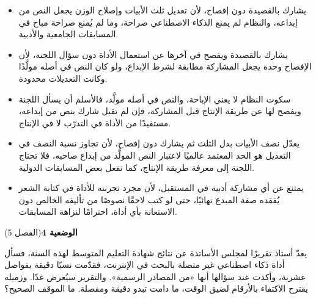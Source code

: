 \documentclass[11pt,a4paper]{article}
\begin{document}
\begin{itemize}[leftmargin=1.0cm, labelsep=6pt, itemsep=3pt, topsep=4pt, parsep=0pt]
  \item[\textbf{أ)}] يشارك بالقصيدة دون إفصاح، لأن تعديل ثلث الأبيات وإصلاح الوزن يجعل النص من إبداعه، والنظام لم يمنع الذكاء الاصطناعي صراحة، وما لم يُمنع صراحة مباح في المسابقات الجامعية والأدبية.
  \item[\textbf{ب)}] يشارك بالقصيدة ويفصح في آخرها عن استعمال الأداة دون سؤال اللجنة، لأن الإفصاح وحده يجعل المشاركة مطابقة لشرط الإبداع، ولو كان النص في أصله مولَّدًا وكانت التعديلات محدودة.
  \item[\textbf{ج)}] سكوت النظام لا يعني الإباحة، والنص في أصله مولَّد، فالأسلم أن يسأل اللجنة ويفصح لها عن طريقة الإنتاج قبل المشاركة، فإن لم تقبل شارك بنص من إبداعه، مستفيدًا من الأداة في التدرّب لا في الإنتاج.
  \item[\textbf{د)}] يعدّل نصف الأبيات بدل الثلث ثم يشارك دون إفصاح، لأن تجاوز نسبة النصف في التعديل هو الحد المعتمد عالميًا لاعتبار النص المولَّد من إبداع صاحبه، فلا تحتاج اللجنة إلى معرفة طريقة الإنتاج، كما تفعل بعض المسابقات الدولية.
  \item[\textbf{هـ)}] يمتنع عن أي مشاركة أدبية في المستقبل، لأن مجرد تجربته للأداة في كتابة الشعر يُفقده صفة المبدع نهائيًا، حتى لو كتب لاحقًا نصوصًا من تأليفه الخالص دون الاستعانة بأي أداة، احترامًا لنزاهة المسابقات.
\end{itemize}
\par\vspace{6pt}
\noindent
{\large\khatt\textbf{الوضعية 4}}\hfill{\small(الفصل 5)}\par\nopagebreak\vspace{3pt}
\setlength{\fboxsep}{7pt}\colorbox{gray!10}{\parbox{\dimexpr\linewidth-14pt}{يعدّ أستاذ تقريرًا لمجلس الأساتذة عن نتائج شهادة التعليم المتوسط لهذه السنة، فسأل أداة ذكاء اصطناعي غير متصلة بالبحث في الإنترنت، فقدّمت نسبًا دقيقة بفواصل عشرية، وأكدت عند سؤالها أنها «من المصادر الرسمية». والتقرير سيُعرض غدًا. وزميله يقترح الاكتفاء بالأرقام لضيق الوقت، ما دامت تبدو دقيقة ومفصلة. ما الموقف الصحيح؟}}\par\nopagebreak
\end{document}

